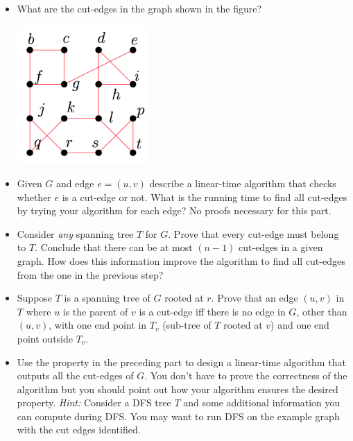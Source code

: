 \documentclass[11pt]{article}
\begin{document}
\begin{enumerate}
  \begin{itemize}
  \item What are the cut-edges in the graph shown in the figure?
           \begin{center}
                \includegraphics[width=5cm]{Fig/graph}
       \end{center}

  \item Given $G$ and edge $e=(u,v)$ describe a linear-time algorithm
    that checks whether $e$ is a cut-edge or not. What is the running time
    to find all cut-edges by trying your algorithm for each edge? No proofs
    necessary for this part.
  \item Consider {\em any} spanning tree $T$ for $G$. Prove that every
    cut-edge must belong to $T$. Conclude that there can be at most $(n-1)$
    cut-edges in a given graph. How does this information improve the 
    algorithm to find all cut-edges from the one in the previous step?
  \item Suppose $T$ is a spanning tree of $G$ rooted at $r$.
    Prove that an edge $(u,v)$ in $T$ where $u$ is
    the parent of $v$ is a cut-edge iff there is no edge in $G$, other
    than $(u,v)$, 
    with one end point in $T_v$ (sub-tree of $T$ rooted at $v$)
    and one end point outside $T_v$.
  \item Use the property in the preceding part to design a linear-time
    algorithm that outputs all the cut-edges of $G$. You don't have to 
    prove the correctness of the algorithm but you should point out how
    your algorithm ensures the desired property. {\em Hint:} Consider
    a DFS tree $T$ and some additional information you can compute
    during DFS. You may want to run DFS on the example graph with the
    cut edges identified.
  \end{itemize}


\end{enumerate}
\vspace{1in}
\end{document}
